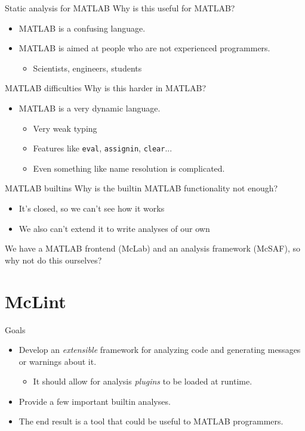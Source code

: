 \documentclass{beamer}
\begin{document}
\begin{frame}{Static analysis for MATLAB}
Why is this useful for MATLAB?
\begin{itemize}
\item MATLAB is a confusing language.
\item MATLAB is aimed at people who are not experienced programmers.
    \begin{itemize}
        \item Scientists, engineers, students
    \end{itemize}
\end{itemize}
\end{frame}

\begin{frame}{MATLAB difficulties}
Why is this harder in MATLAB?
\begin{itemize}
\item MATLAB is a very dynamic language.
    \begin{itemize}
    \item Very weak typing
    \item Features like {\tt eval}, {\tt assignin}, {\tt clear}...
    \item Even something like name resolution is complicated.
    \end{itemize}
\end{itemize}
\end{frame}

\begin{frame}{MATLAB builtins}
Why is the builtin MATLAB functionality not enough?
\begin{itemize}
\item It's closed, so we can't see how it works
\item We also can't extend it to write analyses of our own
\end{itemize}
We have a MATLAB frontend (McLab) and an analysis framework (McSAF), so why
not do this ourselves?
\end{frame}

\section{McLint}
\begin{frame}{Goals}
\begin{itemize}
\item Develop an \emph{extensible} framework for analyzing code and
generating messages or warnings about it.
    \begin{itemize}
    \item It should allow for analysis \emph{plugins} to be loaded at runtime.
    \end{itemize}
\item Provide a few important builtin analyses.
\item The end result is a tool that could be useful to MATLAB programmers.
\end{itemize}
\end{frame}
\end{document}
